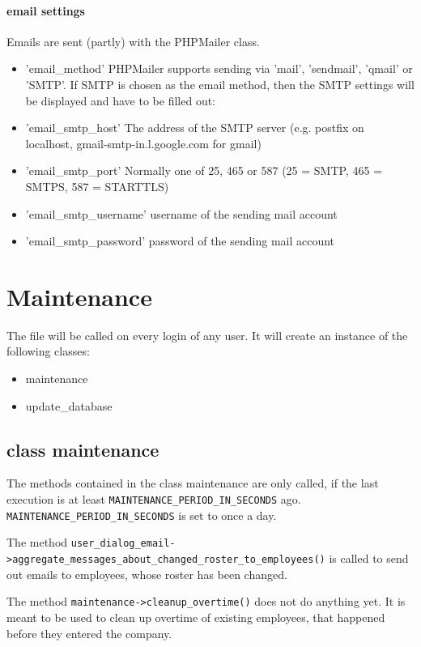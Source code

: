 \paragraph{email settings}
Emails are sent (partly) with the PHPMailer class.
\begin{itemize}
	\item 'email\_method'  PHPMailer supports sending via 'mail', 'sendmail', 'qmail' or 'SMTP'. If SMTP is chosen as the email method, then the SMTP settings will be displayed and have to be filled out:
	\item 'email\_smtp\_host' The address of the SMTP server (e.g. postfix on localhost, gmail-smtp-in.l.google.com for gmail)	
	\item 'email\_smtp\_port' Normally one of 25, 465 or 587 (25 = SMTP, 465 = SMTPS, 587 = STARTTLS)
	\item 'email\_smtp\_username' username of the sending mail account
	\item 'email\_smtp\_password' password of the sending mail account
\end{itemize}



\section{Maintenance}
The file  will be called on every login of any user.
It will create an instance of the following classes:
\begin{itemize}
    \item maintenance
    \item update\_database
\end{itemize}

\subsection{class maintenance}
The methods contained in the class maintenance are only called, if the last execution is at least \lstinline|MAINTENANCE_PERIOD_IN_SECONDS| ago.
\lstinline|MAINTENANCE_PERIOD_IN_SECONDS| is set to once a day.

The method \lstinline|user_dialog_email->aggregate_messages_about_changed_roster_to_employees()| is called to send out emails to employees, whose roster has been changed.

The method \lstinline|maintenance->cleanup_overtime()| does not do anything yet. It is meant to be used to clean up overtime of existing employees, that happened before they entered the company.

